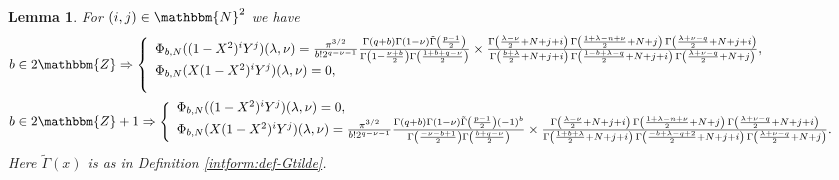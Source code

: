 \documentclass{article}
\newtheorem{lemma}[proposition]{Lemma}
\theoremstyle{remark}
\begin{document}
\begin{lemma}
  \label{images:lem-Psi-evaluation}For $(i, j) \in \mathbbm{N}^2$ we have
  \begin{eqnarray}
    & b \in 2\mathbbm{Z} \Rightarrow \left\{ \begin{array}{ll}
      \Phi_{b, N} ((1 - X^2)^i Y^j) (\lambda, \nu) = \frac{\pi^{3 / 2}}{b!
      2^{q - \nu - 1}} \frac{\Gamma (q + b) \Gamma (1 - \nu) \tilde{\Gamma}
      \left( \frac{p - 1}{2} \right)}{\Gamma \left( 1 - \frac{\nu + b}{2}
      \right) \Gamma \left( \frac{1 + b + q - \nu}{2} \right)} \times
      \frac{\Gamma \left( \frac{\lambda - \nu}{2} + N + j + i \right) 
      \hspace{0.17em} \Gamma \left( \frac{1 + \lambda - n + \nu}{2} + N + j
      \right)  \hspace{0.17em} \Gamma \left( \frac{\lambda + \nu - q}{2} + N +
      j + i \right)}{\Gamma \left( \frac{b + \lambda}{2} + N + j + i \right) 
      \hspace{0.17em} \Gamma \left( \frac{1 - b + \lambda - q}{2} + N + j + i
      \right)  \hspace{0.17em} \Gamma \left( \frac{\lambda + \nu - q}{2} + N +
      j \right)}, & \\
      \Phi_{b, N} (X (1 - X^2)^i Y^j) (\lambda, \nu) = 0, & \\
      & 
    \end{array} \right. &  \nonumber\\
    & b \in 2\mathbbm{Z}+ 1 \Rightarrow \left\{ \begin{array}{ll}
      \Phi_{b, N} ((1 - X^2)^i Y^j) (\lambda, \nu) = 0, & \\
      \Phi_{b, N} (X (1 - X^2)^i Y^j) (\lambda, \nu) = \frac{\pi^{3 / 2}}{b!
      2^{q - \nu - 1}} \frac{\Gamma (q + b) \Gamma (1 - \nu) \tilde{\Gamma}
      \left( \frac{p - 1}{2} \right) (- 1)^b}{\Gamma \left( \frac{- \nu - b +
      1}{2} \right) \Gamma \left( \frac{b + q - \nu}{2} \right)} \times
      \frac{\Gamma \left( \frac{\lambda - \nu}{2} + N + j + i \right) 
      \hspace{0.17em} \Gamma \left( \frac{1 + \lambda - n + \nu}{2} + N + j
      \right)  \hspace{0.17em} \Gamma \left( \frac{\lambda + \nu - q}{2} + N +
      j + i \right)}{\Gamma \left( \frac{1 + b + \lambda}{2} + N + j + i
      \right)  \hspace{0.17em} \Gamma \left( \frac{- b + \lambda - q + 2}{2} +
      N + j + i \right)  \hspace{0.17em} \Gamma \left( \frac{\lambda + \nu -
      q}{2} + N + j \right)} . & 
    \end{array} \right. &  \nonumber
  \end{eqnarray}
  Here $\tilde{\Gamma} (x)$ is as in Definition \ref{intform:def-Gtilde}.
\end{lemma}
\end{document}
